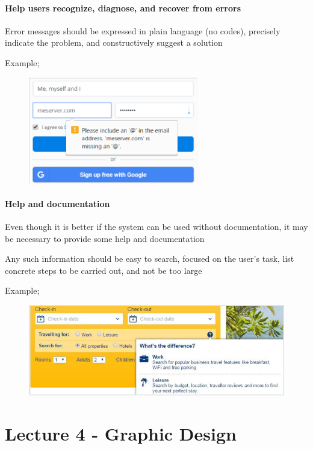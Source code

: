 \documentclass[]{project_plan}
\begin{document}
\newpage

\subsubsection{Help users recognize, diagnose, and recover from errors}
Error messages should be expressed in plain language (no codes), precisely
indicate the problem, and constructively suggest a solution

Example;
\begin{figure}[h!]
  \centering
  \includegraphics[width=20em]{help_users_recognize_diagnoze_and_recover_from_errors_example.png}
\end{figure}

\subsubsection{Help and documentation}
Even though it is better if the system can be used without documentation, it may be
necessary to provide some help and documentation

Any such information should be easy to search, focused on the user's task, list
concrete steps to be carried out, and not be too large

Example;
\begin{figure}[h!]
  \centering
  \includegraphics[width=\linewidth]{help_and_documentation_example.png}
\end{figure}

\chapter{Lecture 4 - Graphic Design}
\end{document}
